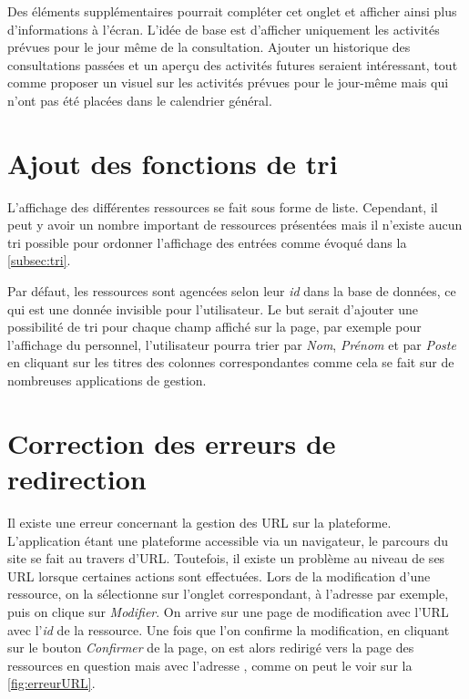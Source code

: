 \documentclass[noposter]{polytech/polytech}
\begin{document}
Des éléments supplémentaires pourrait compléter cet onglet et afficher ainsi plus d'informations à l'écran. L'idée de base est d'afficher uniquement les activités prévues pour le jour même de la consultation. Ajouter un historique des consultations passées et un aperçu des activités futures seraient intéressant, tout comme proposer un visuel sur les activités prévues pour le jour-même mais qui n'ont pas été placées dans le calendrier général. 


\section{Ajout des fonctions de tri}

L'affichage des différentes ressources se fait sous forme de liste. Cependant, il peut y avoir un nombre important de ressources présentées mais il n'existe aucun tri possible pour ordonner l'affichage des entrées comme évoqué dans la \autoref{subsec:tri}. 

Par défaut, les ressources sont agencées selon leur \textit{id} dans la base de données, ce qui est une donnée invisible pour l'utilisateur. Le but serait d'ajouter une possibilité de tri pour chaque champ affiché sur la page, par exemple pour l'affichage du personnel, l'utilisateur pourra trier par \textit{Nom}, \textit{Prénom} et par \textit{Poste} en cliquant sur les titres des colonnes correspondantes comme cela se fait sur de nombreuses applications de gestion. 


\section{Correction des erreurs de redirection}

Il existe une erreur concernant la gestion des URL sur la plateforme. L'application étant une plateforme accessible via un navigateur, le parcours du site se fait au travers d'URL. Toutefois, il existe un problème au niveau de ses URL lorsque certaines actions sont effectuées. Lors de la modification d'une ressource, on la sélectionne sur l'onglet correspondant, à l'adresse  par exemple, puis on clique sur \textit{Modifier}. On arrive sur une page de modification avec l'URL  avec l'\textit{id} de la ressource. Une fois que l'on confirme la modification, en cliquant sur le bouton \textit{Confirmer} de la page, on est alors redirigé vers la page des ressources en question mais avec l'adresse , comme on peut le voir sur la \autoref{fig:erreurURL}. 
\end{document}

